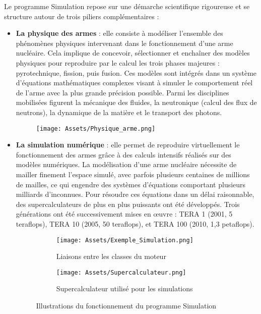 \documentclass[12pt,a4paper]{report}
\begin{document}
Le programme Simulation repose sur une démarche scientifique rigoureuse et se structure autour de trois piliers complémentaires :
\renewcommand{\labelitemi}{$\bullet$}
\begin{itemize}
\item \textbf{La physique des armes} : elle consiste à modéliser l'ensemble des phénomènes physiques intervenant dans le fonctionnement d'une arme nucléaire. Cela implique de concevoir, sélectionner et enchaîner des modèles physiques pour reproduire par le calcul les trois phases majeures : pyrotechnique, fission, puis fusion. Ces modèles sont intégrés dans un système d’équations mathématiques complexes visant à simuler le comportement réel de l’arme avec la plus grande précision possible. Parmi les disciplines mobilisées figurent la mécanique des fluides, la neutronique (calcul des flux de neutrons), la dynamique de la matière et le transport des photons.
\begin{figure}[H]
    \centering %
    \texttt{[image: Assets/Physique\_arme.png]}
\end{figure}

\item \textbf{La simulation numérique} : elle permet de reproduire virtuellement le fonctionnement des armes grâce à des calculs intensifs réalisés sur des modèles numériques. La modélisation d’une arme nucléaire nécessite de mailler finement l’espace simulé, avec parfois plusieurs centaines de millions de mailles, ce qui engendre des systèmes d’équations comportant plusieurs milliards d’inconnues. Pour résoudre ces équations dans un délai raisonnable, des supercalculateurs de plus en plus puissants ont été développés. Trois générations ont été successivement mises en œuvre : TERA 1 (2001, 5 teraflops), TERA 10 (2005, 50 teraflops), et TERA 100 (2010, 1,3 petaflops).

\begin{figure}[H]
    \hspace{0cm} %
    \begin{subfigure}[t]{0.42\textwidth}
        \centering
        \texttt{[image: Assets/Exemple\_Simulation.png]}
        \caption{Liaisons entre les classes du moteur}
    \end{subfigure}
    \hspace{10em} %
    \begin{subfigure}[t]{0.42\textwidth}
        \centering
        \texttt{[image: Assets/Supercalculateur.png]}
        \caption{Supercalculateur utilisé pour les simulations}
    \end{subfigure}
    \caption{Illustrations du fonctionnement du programme Simulation}
    \label{fig:images}
\end{figure}


\end{itemize}
\end{document}
